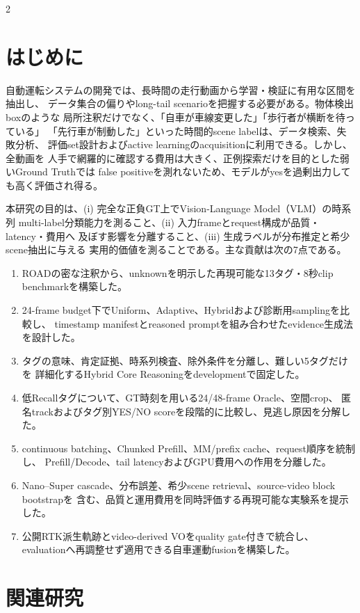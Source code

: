 \documentclass[9pt,a4paper]{extarticle}
\begin{document}
\begin{multicols}{2}
\section{はじめに}
自動運転システムの開発では、長時間の走行動画から学習・検証に有用な区間を抽出し、
データ集合の偏りやlong-tail scenarioを把握する必要がある。物体検出boxのような
局所注釈だけでなく、「自車が車線変更した」「歩行者が横断を待っている」
「先行車が制動した」といった時間的scene labelは、データ検索、失敗分析、
評価set設計およびactive learningのacquisitionに利用できる。しかし、全動画を
人手で網羅的に確認する費用は大きく、正例探索だけを目的とした弱いGround Truthでは
false positiveを測れないため、モデルがyesを過剰出力しても高く評価され得る。

本研究の目的は、(i) 完全な正負GT上でVision-Language Model（VLM）の時系列
multi-label分類能力を測ること、(ii) 入力frameとrequest構成が品質・latency・費用へ
及ぼす影響を分離すること、(iii) 生成ラベルが分布推定と希少scene抽出に与える
実用的価値を測ることである。主な貢献は次の7点である。
\begin{enumerate}
  \item ROADの密な注釈から、unknownを明示した再現可能な13タグ・8秒clip benchmarkを構築した。
  \item 24-frame budget下でUniform、Adaptive、Hybridおよび診断用samplingを比較し、
        timestamp manifestとreasoned promptを組み合わせたevidence生成法を設計した。
  \item タグの意味、肯定証拠、時系列検査、除外条件を分離し、難しい5タグだけを
        詳細化するHybrid Core Reasoningをdevelopmentで固定した。
  \item 低Recallタグについて、GT時刻を用いる24/48-frame Oracle、空間crop、
        匿名trackおよびタグ別YES/NO scoreを段階的に比較し、見逃し原因を分解した。
  \item continuous batching、Chunked Prefill、MM/prefix cache、request順序を統制し、
        Prefill/Decode、tail latencyおよびGPU費用への作用を分離した。
  \item Nano--Super cascade、分布誤差、希少scene retrieval、source-video block bootstrapを
        含む、品質と運用費用を同時評価する再現可能な実験系を提示した。
  \item 公開RTK派生軌跡とvideo-derived VOをquality gate付きで統合し、
        evaluationへ再調整せず適用できる自車運動fusionを構築した。
\end{enumerate}

\section{関連研究}

\end{multicols}
\end{document}
